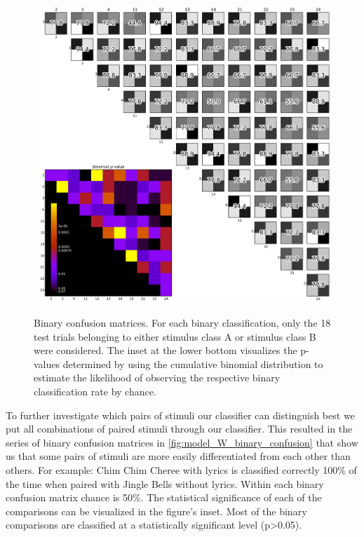 \begin{figure}[h] 
  \begin{center}
    \includegraphics[width=.83\textwidth,keepaspectratio=true]{Figures/model_W_binary_confusion}
   \\\vspace{-0.8em}
    \caption{Binary confusion matrices.
    For each binary classification, only the 18 test trials belonging to either stimulus class A or stimulus class B were considered.
    The inset at the lower bottom visualizes the p-values determined by using the cumulative binomial distribution to estimate the likelihood of observing the respective binary classification rate by chance.}
    \label{fig:model_W_binary_confusion}
  \end{center}
  \vspace{-1em}
\end{figure}

To further investigate which pairs of stimuli our classifier can distinguish best we put all combinations of paired stimuli through our classifier.
This resulted in the series of binary confusion matrices in \autoref{fig:model_W_binary_confusion} that show us that some pairs of stimuli are more easily differentiated from each other than others. 
For example: Chim Chim Cheree with lyrics is classified correctly 100\% of the time when paired with Jingle Bells without lyrics. 
Within each binary confusion matrix chance is 50\%.
The statistical significance of each of the comparisons can be visualized in the figure's inset. 
Most of the binary comparisons are classified at a statistically significant level (p>0.05).